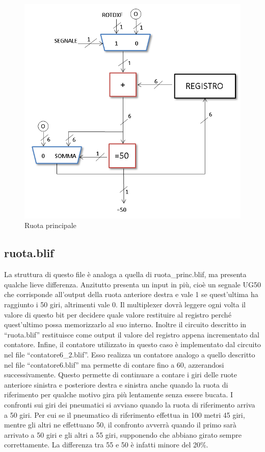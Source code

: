 \documentclass[a4paper,titlepage]{book}
\begin{document}
\begin{figure}[!hb]
\centering
\includegraphics[scale=0.5]{schemi/ruota_principale.png}
\caption{Ruota principale}
\end{figure}



\subsection{ruota.blif}

La struttura di questo file è analoga a quella di ruota\_princ.blif, ma presenta qualche lieve  differenza.  Anzitutto presenta un input in più, cioè un segnale UG50 che corrisponde all'output della  ruota anteriore destra e vale 1 se quest'ultima ha raggiunto i 50 giri, altrimenti vale 0. Il  multiplexer dovrà leggere ogni volta il valore di questo bit per decidere quale valore  restituire al registro perché quest'ultimo possa memorizzarlo al suo interno.  Inoltre il circuito descritto in ``ruota.blif'' restituisce come output il valore del registro appena incrementato dal  contatore.  Infine, il contatore utilizzato in questo caso è implementato dal circuito nel file ``contatore6\_2.blif''. Esso  realizza un contatore analogo a quello descritto nel file ``contatore6.blif'' ma permette di contare fino a 60, azzerandosi  successivamente. Questo permette di continuare a contare i giri delle ruote anteriore  sinistra e posteriore destra e sinistra anche quando la ruota di riferimento per qualche  motivo gira più lentamente senza essere bucata. I confronti sui giri dei pneumatici si  avviano quando la ruota di riferimento arriva a 50 giri. Per cui se il pneumatico di  riferimento effettua in 100 metri 45 giri, mentre gli altri ne effettuano 50, il confronto  avverrà quando il primo sarà arrivato a 50 giri e gli altri a 55 giri, supponendo che abbiano  girato sempre correttamente. La differenza tra 55 e 50 è infatti minore del 20\%.  
\end{document}
